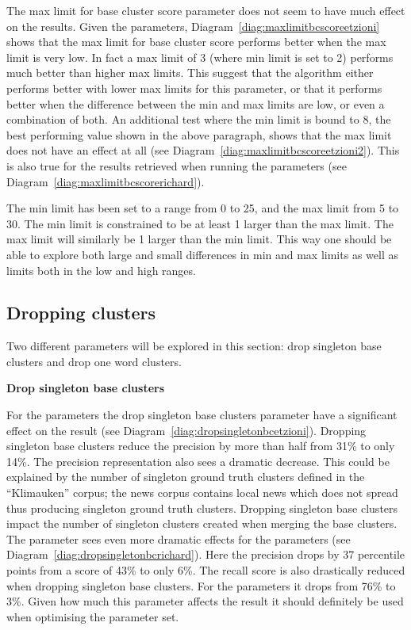 The max limit for base cluster score parameter does not seem to have much effect on the results. Given the \citeauthor{Oren1998} parameters, Diagram~\ref{diag:maxlimitbcscoreetzioni} shows that the max limit for base cluster score performs better when the max limit is very low. In fact a max limit of 3 (where min limit is set to 2) performs much better than higher max limits. This suggest that the algorithm either performs better with lower max limits for this parameter, or that it performs better when the difference between the min and max limits are low, or even a combination of both. An additional test where the min limit is bound to 8, the best performing value shown in the above paragraph, shows that the max limit does not have an effect at all (see Diagram~\ref{diag:maxlimitbcscoreetzioni2}). This is also true for the results retrieved when running the \citeauthor{Moe2014compact} parameters (see Diagram~\ref{diag:maxlimitbcscorerichard}).

The min limit has been set to a range from 0 to 25, and the max limit from 5 to 30. The min limit is constrained to be at least 1 larger than the max limit. The max limit will similarly be 1 larger than the min limit. This way one should be able to explore both large and small differences in min and max limits as well as limits both in the low and high ranges.

\subsection{Dropping clusters}
Two different parameters will be explored in this section: drop singleton base clusters and drop one word clusters.

\textbf{Drop singleton base clusters}

For the \citeauthor{Oren1998} parameters the drop singleton base clusters parameter have a significant effect on the result (see Diagram~\ref{diag:dropsingletonbcetzioni}). Dropping singleton base clusters reduce the precision by more than half from 31\% to only 14\%. The precision representation also sees a dramatic decrease. This could be explained by the number of singleton ground truth clusters defined in the ``Klimauken'' corpus; the news corpus contains local news which does not spread thus producing singleton ground truth clusters. Dropping singleton base clusters impact the number of singleton clusters created when merging the base clusters. The parameter sees even more dramatic effects for the \citeauthor{Moe2014} parameters (see Diagram~\ref{diag:dropsingletonbcrichard}). Here the precision drops by 37 percentile points from a score of 43\% to only 6\%. The recall score is also drastically reduced when dropping singleton base clusters. For the \citeauthor{Moe2014} parameters it drops from 76\% to 3\%. Given how much this parameter affects the result it should definitely be used when optimising the parameter set.

